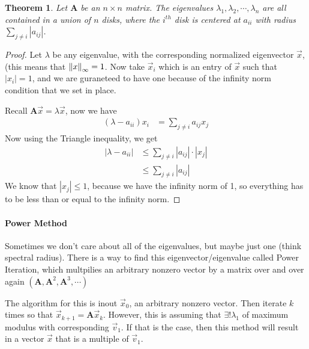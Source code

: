 \documentclass[a4paper,12pt]{article} %
\newtheorem{theorem}{Theorem}
\begin{document}
\begin{theorem}
	Let $\textbf{A}$ be an $n\times n$ matrix. The eigenvalues $\lambda_1, \lambda_2,\cdots, \lambda_n$ are all contained in a union of $n$ disks, where the $i^{th}$ disk is centered at $a_{ii}$ with radius $\sum_{j\neq i} |a_{ij}|$.
\end{theorem}
\begin{proof}
	Let $\lambda$ be any eigenvalue, with the corresponding normalized eigenvector $\vec{x}$, (this means that $\norm{x}_{\infty} = 1$. Now take $\vec{x}_i$ which is an entry of $\vec{x}$ such that $|x_i| = 1$, and we are guraneteed to have one because of the infinity norm condition that we set in place. 
	
	Recall $\textbf{A}\vec{x} = \lambda \vec{x}$, now we have
	\begin{align}
		(\lambda - a_{ii})x_i &= \sum_{j\neq i}a_{ij}x_j
	\end{align}
Now using the Triangle inequality, we get 
	\begin{align}
		|\lambda - a_{ii}| &\leq \sum_{j\neq i} |a_{ij}| \cdot |x_j|\\
		&\leq \sum_{j\neq i} |a_{ij}|
	\end{align}
We know that $|x_j|\leq 1$, because we have the infinity norm of 1, so everything has to be less than or equal to the infinity norm.
\end{proof}

\paragraph{Power Method} 
Sometimes we don't care about all of the eigenvalues, but maybe just one (think spectral radius). There is a way to find this eigenvector/eigenvalue called Power Iteration, which multpilies an arbitrary nonzero vector by a matrix over and over again $(\textbf{A}, \textbf{A}^2, \textbf{A}^3, \cdots)$

The algorithm for this is inout $\vec{x}_0$, an arbitrary nonzero vector. Then iterate $k$ times so that $\vec{x}_{k+1} = \textbf{A}\vec{x}_k$. However, this is assuming that $\exists! \lambda_1$ of maximum modulus with corresponding $\vec{v}_1$. If that is the case, then this method will result in a vector $\vec{x}$ that is a multiple of $\vec{v}_1$.

\end{document}
